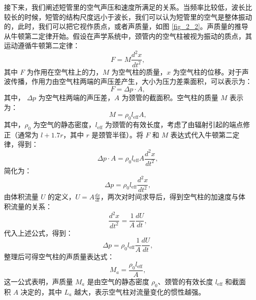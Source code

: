 接下来，我们阐述短管里的空气声压和速度所满足的关系。当频率比较低，波长比较长的时候，短管的结构尺度远小于波长，我们可以认为短管里的空气是整体振动的，此时，我们可以把它视作质点，或者声质量，如图 \ref{fig_2_2}。声质量的推导从牛顿第二定律开始。假设在声学系统中，颈管内的空气柱被视为振动的质点，其运动遵循牛顿第二定律：
\begin{equation} \label{eq2-11}
  F = M \frac{d^2 x}{dt^2},
\end{equation}
其中 \( F \) 为作用在空气柱上的力，\( M \) 为空气柱的质量，\( x \) 为空气柱的位移。对于声波传播，作用力由空气柱两端的声压差产生，大小为压力差乘面积，可以表示为：
\begin{equation} \label{eq2-12}
  F = \Delta p \cdot A,
\end{equation}
其中， \( \Delta p \) 为空气柱两端的声压差，\( A \) 为颈管的截面积。空气柱的质量 \( M \) 表示为：
\begin{equation} \label{eq2-13}
  M = \rho_0 l_{\text{eff}} A,
\end{equation}
其中，\( \rho_0 \) 为空气的静态密度，\( l_{\text{eff}} \) 为颈管的有效长度，考虑了由辐射引起的端点修正（通常为 \( l + 1.7r \)，其中 \( r \) 是颈管半径）。将 \( F \) 和 \( M \) 表达式代入牛顿第二定律，得到：
\begin{equation} \label{eq2-14}
  \Delta p \cdot A = \rho_0 l_{\text{eff}} A \frac{d^2 x}{dt^2},
\end{equation}
简化为：
\begin{equation} \label{eq2-15}
  \Delta p = \rho_0 l_{\text{eff}} \frac{d^2 x}{dt^2},
\end{equation}
由体积流量 \( U \) 的定义，\( U = A \frac{dx}{dt} \)，两次对时间求导后，得到空气柱的加速度与体积流量的关系：
\begin{equation} \label{eq2-16}
  \frac{d^2 x}{dt^2} = \frac{1}{A} \frac{dU}{dt},
\end{equation}
代入上述公式，得到：
\begin{equation} \label{eq2-17}
  \Delta p = \rho_0 l_{\text{eff}} \frac{1}{A} \frac{dU}{dt},
\end{equation}
整理后可得空气柱的声质量表达式：
\begin{equation} \label{eq2-18}
  M_a = \frac{\rho_0 l_{\text{eff}}}{A},
\end{equation}
这一公式表明，声质量 \( M_a \) 是由空气的静态密度 \(\rho_0\)、颈管的有效长度 \(l_{\text{eff}}\) 和截面积 \(A\) 决定的，其中 \( L_a \) 越大，表示空气柱对流量变化的惯性越强。

